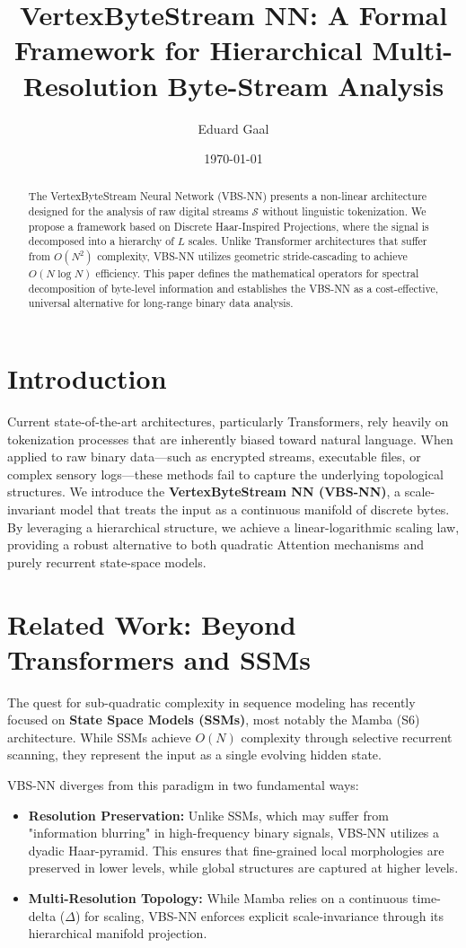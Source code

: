 \documentclass[11pt,a4paper]{article}
\title{\textbf{VertexByteStream NN: A Formal Framework for Hierarchical Multi-Resolution Byte-Stream Analysis}}
\author{Eduard Gaal}
\affil{Independent Researcher \\ \texttt{gaal.eduard@gmail.com}}
\date{\today}
\begin{document}
\maketitle

\begin{abstract}
The VertexByteStream Neural Network (VBS-NN) presents a non-linear architecture designed for the analysis of raw digital streams $\mathcal{S}$ without linguistic tokenization. We propose a framework based on Discrete Haar-Inspired Projections, where the signal is decomposed into a hierarchy of $L$ scales. Unlike Transformer architectures that suffer from $O(N^2)$ complexity, VBS-NN utilizes geometric stride-cascading to achieve $O(N \log N)$ efficiency. This paper defines the mathematical operators for spectral decomposition of byte-level information and establishes the VBS-NN as a cost-effective, universal alternative for long-range binary data analysis.
\end{abstract}

\section{Introduction}
Current state-of-the-art architectures, particularly Transformers, rely heavily on tokenization processes that are inherently biased toward natural language. When applied to raw binary data—such as encrypted streams, executable files, or complex sensory logs—these methods fail to capture the underlying topological structures. We introduce the \textbf{VertexByteStream NN (VBS-NN)}, a scale-invariant model that treats the input as a continuous manifold of discrete bytes. By leveraging a hierarchical structure, we achieve a linear-logarithmic scaling law, providing a robust alternative to both quadratic Attention mechanisms and purely recurrent state-space models.

\section{Related Work: Beyond Transformers and SSMs}
The quest for sub-quadratic complexity in sequence modeling has recently focused on \textbf{State Space Models (SSMs)}, most notably the Mamba (S6) architecture. While SSMs achieve $O(N)$ complexity through selective recurrent scanning, they represent the input as a single evolving hidden state. 

VBS-NN diverges from this paradigm in two fundamental ways:
\begin{itemize}
    \item \textbf{Resolution Preservation:} Unlike SSMs, which may suffer from "information blurring" in high-frequency binary signals, VBS-NN utilizes a dyadic Haar-pyramid. This ensures that fine-grained local morphologies are preserved in lower levels, while global structures are captured at higher levels.
    \item \textbf{Multi-Resolution Topology:} While Mamba relies on a continuous time-delta ($\Delta$) for scaling, VBS-NN enforces explicit scale-invariance through its hierarchical manifold projection.
\end{itemize}
\end{document}
